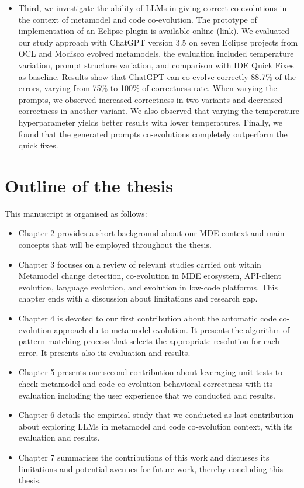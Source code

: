 \begin{itemize}[label=]
	\item Third, we investigate the ability of LLMs in giving correct co-evolutions in the context of metamodel and code co-evolution. The prototype of implementation of an Eclipse plugin is available online (link). We evaluated our study approach with ChatGPT version 3.5 on seven Eclipse projects
		from OCL and Modisco evolved metamodels. the evaluation included temperature variation, prompt structure variation, and comparison with IDE Quick Fixes as baseline. Results show that ChatGPT can co-evolve correctly 88.7\% of the errors, varying from 75\% to 100\% of correctness rate. When varying the prompts, we observed increased
		correctness in two variants and decreased correctness in another variant. We also observed that varying the temperature
		hyperparameter yields better results with lower temperatures. Finally, we found that the generated prompts co-evolutions completely outperform the quick fixes.


\end{itemize}


\section{Outline of the thesis}
This manuscript is organised as follows:
\begin{itemize}[label=\textbullet,font=\small]

\item Chapter 2 provides a short background about our MDE context and main concepts that will be employed throughout the thesis.
\item Chapter 3 focuses on a review of relevant studies carried out within Metamodel change detection, co-evolution in MDE ecosystem, API-client evolution, language evolution, and evolution in low-code platforms. This chapter ends with a discussion about limitations and research gap.
\item Chapter 4 is devoted to our first contribution about the automatic code co-evolution approach du to metamodel evolution. It presents the algorithm of pattern matching process that selects the appropriate resolution for each error. It presents also its evaluation and results.
\item Chapter 5 presents our second contribution about leveraging unit tests to check metamodel and code co-evolution behavioral correctness with its evaluation including the user experience that we conducted and results.
\item Chapter 6 details the empirical study that we conducted as last contribution about exploring LLMs in metamodel and code co-evolution context, with its evaluation and results.
\item Chapter 7 summarises the contributions of this work and discusses its limitations and  potential avenues for future work, thereby concluding this thesis.

\end{itemize}

